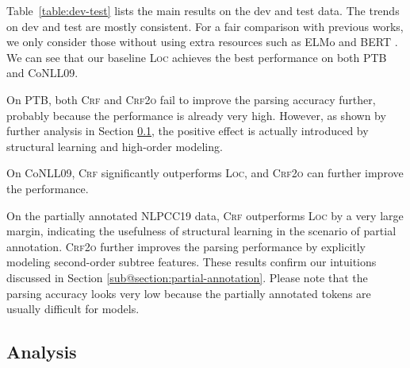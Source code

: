 \documentclass[11pt,a4paper]{article}
\begin{document}
Table~\ref{table:dev-test} lists the main results on the dev and test data.
The trends on dev and test are mostly consistent.
For a fair comparison with previous works, we only consider those without using extra resources such as ELMo \cite{peters-etal-2018-deep} and BERT \cite{devlin-etal-2019-bert}.
We can see that our baseline \textsc{Loc} achieves the best performance on both PTB and CoNLL09.




On PTB, both \textsc{Crf} and \textsc{Crf2o} fail to improve the parsing accuracy further,
probably because the performance is already very high.
However, as shown by further analysis in Section \ref{section:analysis},
the positive effect is actually introduced by structural learning and high-order modeling.


On CoNLL09, \textsc{Crf} significantly outperforms \textsc{Loc},
and \textsc{Crf2o} can further improve the performance.


On the partially annotated NLPCC19 data, \textsc{Crf} outperforms \textsc{Loc} by a very large margin,
indicating the usefulness of structural learning in the scenario of partial annotation.
\textsc{Crf2o} further improves the parsing performance by explicitly modeling second-order subtree features.
These results confirm our intuitions discussed in Section \ref{sub@section:partial-annotation}.
Please note that the parsing accuracy looks very low because the partially annotated tokens
are usually difficult for models.
















 


\subsection{Analysis}
\label{section:analysis}
\end{document}
